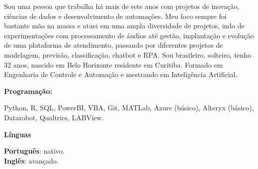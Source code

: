 \documentclass[9pt]{developercv} %
\begin{document}
	\begin{minipage}[t]{0.46\textwidth}
		\vspace{-6pt}
		
		Sou uma pessoa que trabalha há mais de sete anos com projetos de inovação, ciências de dados e desenvolvimento de automações. Meu foco sempre foi bastante mão na massa e atuei em uma  ampla diversidade de projetos, indo de experimentações com processamento de áudios até gestão, implantação e evolução de uma plataforma de atendimento, passando por diferentes projetos de modelagem, previsão, classificação, chatbot e RPA. Sou brasileiro, solteiro, tenho 32 anos, nascido em Belo Horizonte residente em Curitiba. Formado em Engenharia de Controle e Automação e mestrando em Inteligência Artificial.
		
	\end{minipage}
	\hfill %
	\begin{minipage}[t]{0.465\textwidth}
		\vspace{-6pt}
		
		\begin{minipage}[t]{0.2\textwidth}
			\textbf{Programação:}
		\end{minipage}
		\hfill
		\begin{minipage}[t]{0.73\textwidth}
			Python, R, SQL, PowerBI, VBA, Git, MATLab, Azure (básico), Alteryx (básico), Datarobot, Qualtrics, LABView.  
		\end{minipage}
		\vspace{4mm}
		
		\begin{minipage}[t]{0.2\textwidth}
			\textbf{Línguas}
		\end{minipage}
		\hfill
		\begin{minipage}[t]{0.73\textwidth}
			\textbf{Português}: nativo.\\
			\textbf{Inglês}: avançado.
		\end{minipage}
		
	\end{minipage}
	\vspace{-10 pt}
\end{document}
